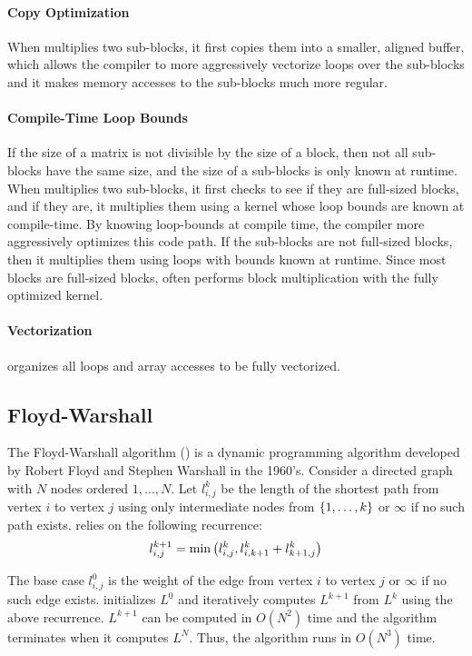 \paragraph{Copy Optimization}
When \block{} multiplies two sub-blocks, it first copies them into a smaller,
aligned buffer, which allows the compiler to more aggressively
vectorize loops over the sub-blocks and it makes memory accesses to the
sub-blocks much more regular.

\paragraph{Compile-Time Loop Bounds}
If the size of a matrix is not divisible by the size of a block, then not all
sub-blocks have the same size, and the size of a sub-blocks is only known
at runtime. When \block{} multiplies two sub-blocks, it first checks to see if
they are full-sized blocks, and if they are, it multiplies them using a kernel
whose loop bounds are known at compile-time. By knowing loop-bounds at compile
time, the compiler more aggressively optimizes this code path.  If the
sub-blocks are not full-sized blocks, then it multiplies them using loops with
bounds known at runtime. Since most blocks are full-sized blocks, \block{}
often performs block multiplication with the fully optimized kernel.

\paragraph{Vectorization}
\block{} organizes all loops and array accesses to be fully vectorized.

\subsection{Floyd-Warshall}
The Floyd-Warshall algorithm (\fw{}) is a dynamic programming algorithm
developed by Robert Floyd and Stephen Warshall in the 1960's. Consider a
directed graph  with $N$ nodes ordered $1, \ldots, N$. Let $l_{i,j}^k$ be the
length of the shortest path from vertex $i$ to vertex $j$ using only
intermediate nodes from $\left\{{1, \ldots, k}\right\}$ or $\infty$ if no such path
exists. \fw{} relies on the following recurrence:
\[
  l_{i,j}^{k+1} = \min \left({l_{i,j}^k, l_{i,k+1}^k + l_{k+1,j}^k}\right)
\]

The base case $l_{i,j}^0$ is the weight of the edge from vertex $i$ to vertex
$j$ or $\infty$ if no such edge exists. \fw{} initializes $L^0$ and
iteratively computes $L^{k+1}$ from $L^{k}$ using the above recurrence.
$L^{k+1}$ can be computed in $O(N^2)$ time and the algorithm terminates when it
computes $L^N$. Thus, the algorithm runs in $O(N^3)$ time.
